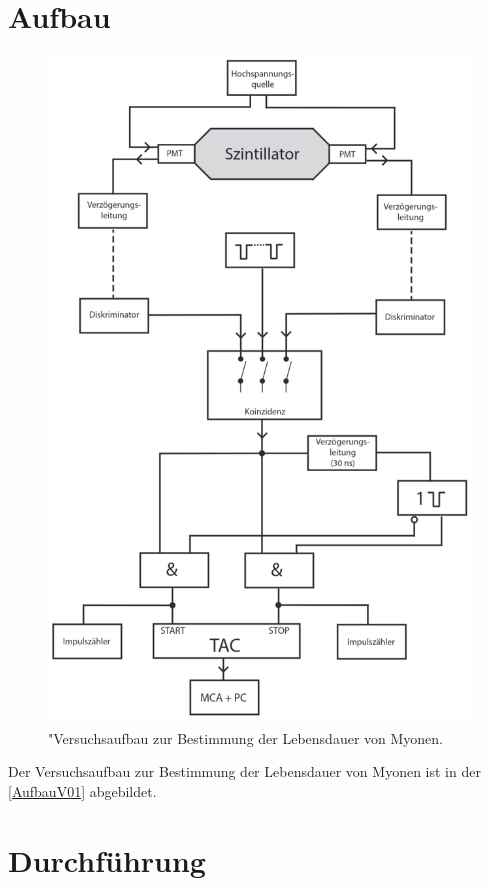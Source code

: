 \section{Aufbau}
\label{Aufbau}
\begin{figure}
    \centering
    \includegraphics{bilder/AufbauV01.png}
    \caption{"Versuchsaufbau zur Bestimmung der Lebensdauer von Myonen. \cite{anleitungV01}}
    \label{AufbauV01}
\end{figure}

Der Versuchsaufbau zur Bestimmung der Lebensdauer von Myonen ist in der \autoref{AufbauV01} abgebildet. 

\section{Durchführung}
\label{sec:Durchführung}
